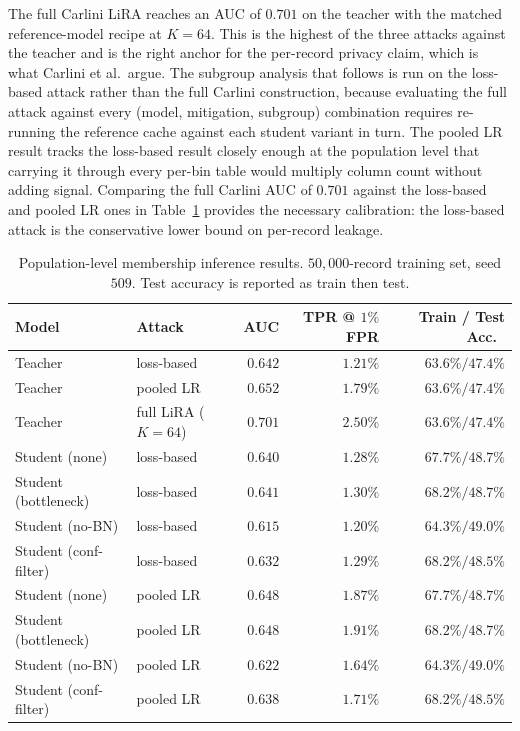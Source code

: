 \documentclass[conference]{IEEEtran}
\begin{document}
The full Carlini LiRA reaches an AUC of $0.701$ on the teacher with the matched reference-model recipe at $K = 64$. This is the highest of the three attacks against the teacher and is the right anchor for the per-record privacy claim, which is what Carlini et al.\ argue. The subgroup analysis that follows is run on the loss-based attack rather than the full Carlini construction, because evaluating the full attack against every (model, mitigation, subgroup) combination requires re-running the reference cache against each student variant in turn. The pooled LR result tracks the loss-based result closely enough at the population level that carrying it through every per-bin table would multiply column count without adding signal. Comparing the full Carlini AUC of $0.701$ against the loss-based and pooled LR ones in Table~\ref{tab:population} provides the necessary calibration: the loss-based attack is the conservative lower bound on per-record leakage.

\begin{table}[t]
\caption{Population-level membership inference results. $50{,}000$-record training set, seed $509$. Test accuracy is reported as train then test.}
\label{tab:population}
\centering
\footnotesize
\setlength{\tabcolsep}{8pt}
\begin{tabular}{llrrr}
\toprule
Model & Attack & AUC & TPR @ $1\%$ FPR & Train / Test Acc.\ \\
\midrule
Teacher & loss-based & $0.642$ & $1.21\%$ & $63.6\% / 47.4\%$ \\
Teacher & pooled LR & $0.652$ & $1.79\%$ & $63.6\% / 47.4\%$ \\
Teacher & full LiRA ($K{=}64$) & $0.701$ & $2.50\%$ & $63.6\% / 47.4\%$ \\
\midrule
Student (none) & loss-based & $0.640$ & $1.28\%$ & $67.7\% / 48.7\%$ \\
Student (bottleneck) & loss-based & $0.641$ & $1.30\%$ & $68.2\% / 48.7\%$ \\
Student (no-BN) & loss-based & $0.615$ & $1.20\%$ & $64.3\% / 49.0\%$ \\
Student (conf-filter) & loss-based & $0.632$ & $1.29\%$ & $68.2\% / 48.5\%$ \\
\midrule
Student (none) & pooled LR & $0.648$ & $1.87\%$ & $67.7\% / 48.7\%$ \\
Student (bottleneck) & pooled LR & $0.648$ & $1.91\%$ & $68.2\% / 48.7\%$ \\
Student (no-BN) & pooled LR & $0.622$ & $1.64\%$ & $64.3\% / 49.0\%$ \\
Student (conf-filter) & pooled LR & $0.638$ & $1.71\%$ & $68.2\% / 48.5\%$ \\
\bottomrule
\end{tabular}
\end{table}
\end{document}
